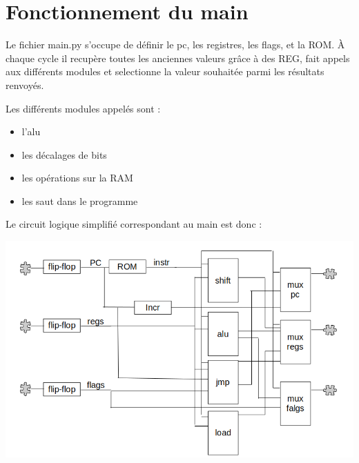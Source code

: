 \documentclass[french, 12pt]{article}
\begin{document}
\section*{Fonctionnement du main}

Le fichier main.py s'occupe de définir le pc, les registres, les flags, et la ROM. À chaque cycle il recupère toutes les anciennes valeurs grâce à des REG, fait appels aux différents modules et selectionne la valeur souhaitée parmi les résultats renvoyés.

Les différents modules appelés sont :
\begin{itemize}
    \item l'alu
    \item les décalages de bits
    \item les opérations sur la RAM
    \item les saut dans le programme
\end{itemize}

Le circuit logique simplifié correspondant au main est donc :

\includegraphics[width=17cm]{circuit_main.png}
\end{document}
